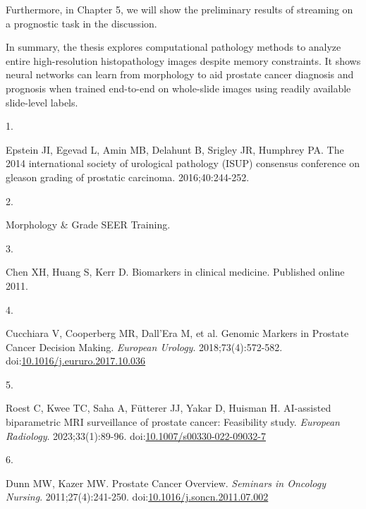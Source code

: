 \documentclass[
  12pt,
  a5,margin=2cmpaper,
]{article}
\newlength{\cslhangindent}
\newlength{\csllabelwidth}
\newlength{\cslentryspacingunit} %
\newenvironment{CSLReferences}[2] %
 {%
  \setlength{\parindent}{0pt}
  \ifodd #1
  \let\oldpar\par
  \def\par{\hangindent=\cslhangindent\oldpar}
  \fi
  \setlength{\parskip}{#2\cslentryspacingunit}
 }%
 {}
\newcommand{\CSLLeftMargin}[1]{\parbox[t]{\csllabelwidth}{#1}}
\newcommand{\CSLRightInline}[1]{\parbox[t]{\linewidth - \csllabelwidth}{#1}\break}
\begin{document}
Furthermore, in Chapter 5, we will show the preliminary results of
streaming on a prognostic task in the discussion.

In summary, the thesis explores computational pathology methods to
analyze entire high-resolution histopathology images despite memory
constraints. It shows neural networks can learn from morphology to aid
prostate cancer diagnosis and prognosis when trained end-to-end on
whole-slide images using readily available slide-level labels.

\pagebreak

\hypertarget{refs}{}
\begin{CSLReferences}{0}{0}
\leavevmode{}%
\CSLLeftMargin{1. }%
\CSLRightInline{Epstein JI, Egevad L, Amin MB, Delahunt B, Srigley JR,
Humphrey PA. The 2014 international society of urological pathology
({ISUP}) consensus conference on gleason grading of prostatic carcinoma.
2016;40:244-252.}

\leavevmode{}%
\CSLLeftMargin{2. }%
\CSLRightInline{Morphology \& {Grade} \textbar{} {SEER Training}.}

\leavevmode{}%
\CSLLeftMargin{3. }%
\CSLRightInline{Chen XH, Huang S, Kerr D. Biomarkers in clinical
medicine. Published online 2011.}

\leavevmode{}%
\CSLLeftMargin{4. }%
\CSLRightInline{Cucchiara V, Cooperberg MR, Dall'Era M, et al. Genomic
{Markers} in {Prostate Cancer Decision Making}. \emph{European Urology}.
2018;73(4):572-582.
doi:\href{https://doi.org/10.1016/j.eururo.2017.10.036}{10.1016/j.eururo.2017.10.036}}

\leavevmode{}%
\CSLLeftMargin{5. }%
\CSLRightInline{Roest C, Kwee TC, Saha A, Fütterer JJ, Yakar D, Huisman
H. {AI-assisted} biparametric {MRI} surveillance of prostate cancer:
Feasibility study. \emph{European Radiology}. 2023;33(1):89-96.
doi:\href{https://doi.org/10.1007/s00330-022-09032-7}{10.1007/s00330-022-09032-7}}

\leavevmode{}%
\CSLLeftMargin{6. }%
\CSLRightInline{Dunn MW, Kazer MW. Prostate {Cancer Overview}.
\emph{Seminars in Oncology Nursing}. 2011;27(4):241-250.
doi:\href{https://doi.org/10.1016/j.soncn.2011.07.002}{10.1016/j.soncn.2011.07.002}}

\end{CSLReferences}
\end{document}
